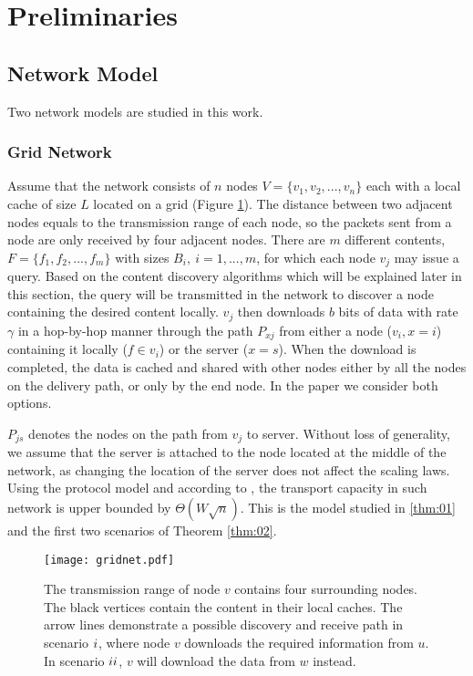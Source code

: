 \documentclass[journal]{IEEEtran}
\theoremstyle{plain}
\theoremstyle{remark}
\begin{document}
\section{Preliminaries}
\label{sec:netmodel}

\subsection{Network Model}
Two network models are studied in this work.
\subsubsection{Grid Network}
Assume that the network consists of $n$ nodes $V=\{v_1,v_2,...,v_n\}$ each with a local cache of size $L$ located on a grid (Figure \ref{fig:gridnet}). The distance between two adjacent nodes equals to the transmission range of each node, so the packets sent from a node are only received by four adjacent nodes. There are $m$ different contents, $F=\{f_1,f_2,...,f_m\}$ with sizes $B_i,\ i=1,...,m$, for which each node $v_j$ may issue a query. Based on the content discovery algorithms which will be explained later in this section, the query will be transmitted in the network to discover a node containing the desired content locally. $v_j$ then downloads $b$ bits of data with rate $\gamma$ in a hop-by-hop manner through the path $P_{xj}$ from either a node ($v_i, x=i$) containing it locally ($f\in v_i$) or the server ($x=s$). When the download is completed, the data is cached and shared with other nodes either by all the nodes on the delivery path, or only by the end node. In the paper we consider both options. 

$P_{js}$ denotes the nodes on the path from $v_j$ to server. Without loss of generality, we assume that the server is attached to the node located at the middle of the network, as changing the location of the server does not affect the scaling laws. Using the protocol model and according to \cite{book06:Xue},  the transport capacity in such network is upper bounded by $\Theta(W\sqrt{n})$. This is the model studied in \ref{thm:01} and the first two scenarios of Theorem \ref{thm:02}.
\begin{figure}[http]
    \center
      \texttt{[image: gridnet.pdf]}\\
      \caption{The transmission range of node $v$ contains four surrounding nodes. The black vertices contain the content in their  local caches. The arrow lines demonstrate a possible discovery and receive path in scenario $\romannumeral 1$, where node $v$ downloads the required information from $u$. In scenario $\romannumeral 2$, $v$ will download the data from $w$ instead.}
    \label{fig:gridnet}
\end{figure}
\end{document}
